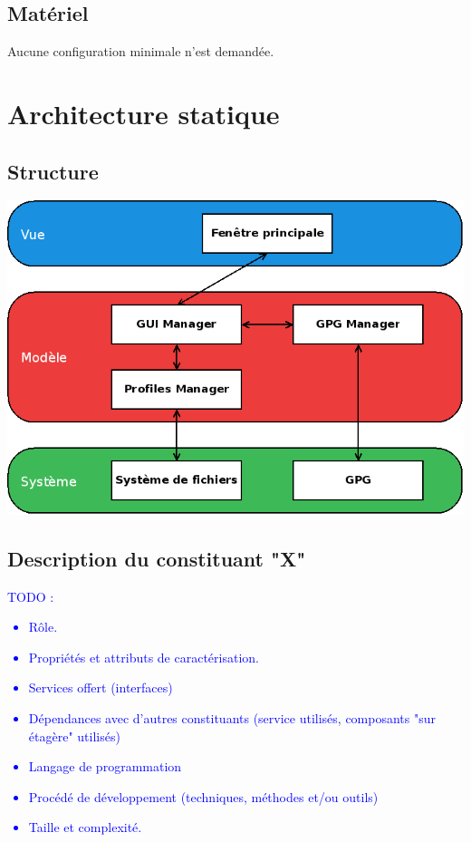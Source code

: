 \documentclass{../res/univ-projet}
\begin{document}
  \subsection{Matériel}
    Aucune configuration minimale n'est demandée.

\section{Architecture statique}
  \subsection{Structure} %
    \includegraphics[scale=0.5]{graphics/diagramme_archi.png}
  \subsection{Description du constituant "X"} %
    \textcolor{blue}{
      TODO : \\
      {\begin{itemize}
        \item Rôle.
        \item Propriétés et attributs de caractérisation.
        \item Services offert (interfaces)
        \item Dépendances avec d'autres constituants (service utilisés,
        composants "sur étagère" utilisés)
        \item Langage de programmation
        \item Procédé de développement (techniques, méthodes et/ou outils)
        \item Taille et complexité.
      \end{itemize}}
    }
\end{document}
